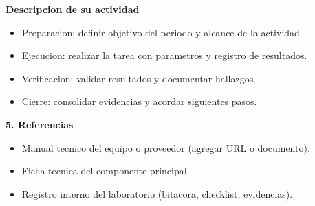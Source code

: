 \documentclass[11pt,a4paper]{article}
\newcommand{\SectionTitle}[1]{%
  \vspace{1mm}
  {\Large\bfseries\color{CNCblue}#1}\par
  \vspace{1mm}
}
\newcommand{\SubTitle}[1]{%
  {\bfseries\color{CNCdark}#1}\par
}
\newcommand{\SafeItem}{\Needspace{3\baselineskip}\item}
\begin{document}
\begin{tcolorbox}[title=\textbf{\color{CNCblue}Metodologia}]
\SubTitle{Descripcion de su actividad}
\begin{itemize}[leftmargin=*,itemsep=2pt]
  \SafeItem Preparacion: definir objetivo del periodo y alcance de la actividad.
  \SafeItem Ejecucion: realizar la tarea con parametros y registro de resultados.
  \SafeItem Verificacion: validar resultados y documentar hallazgos.
  \SafeItem Cierre: consolidar evidencias y acordar siguientes pasos.
\end{itemize}
\end{tcolorbox}

\SectionTitle{5. Referencias}
\begin{tcolorbox}[title=\textbf{\color{CNCblue}Fuentes consultadas}]
\begin{itemize}[leftmargin=*,itemsep=2pt]
  \SafeItem Manual tecnico del equipo o proveedor (agregar URL o documento).
  \SafeItem Ficha tecnica del componente principal.
  \SafeItem Registro interno del laboratorio (bitacora, checklist, evidencias).
\end{itemize}
\end{tcolorbox}
\end{document}
